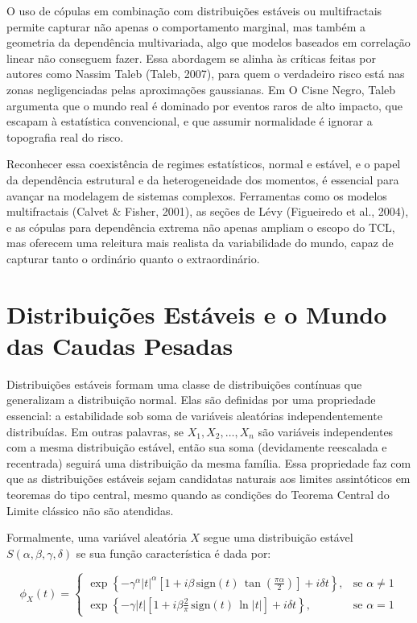 \documentclass[
]{agujournal2019}
\begin{document}
O uso de cópulas em combinação com distribuições estáveis ou
multifractais permite capturar não apenas o comportamento marginal, mas
também a geometria da dependência multivariada, algo que modelos
baseados em correlação linear não conseguem fazer. Essa abordagem se
alinha às críticas feitas por autores como Nassim Taleb (Taleb, 2007),
para quem o verdadeiro risco está nas zonas negligenciadas pelas
aproximações gaussianas. Em O Cisne Negro, Taleb argumenta que o mundo
real é dominado por eventos raros de alto impacto, que escapam à
estatística convencional, e que assumir normalidade é ignorar a
topografia real do risco.

Reconhecer essa coexistência de regimes estatísticos, normal e estável,
e o papel da dependência estrutural e da heterogeneidade dos momentos, é
essencial para avançar na modelagem de sistemas complexos. Ferramentas
como os modelos multifractais (Calvet \& Fisher, 2001), as seções de
Lévy (Figueiredo et al., 2004), e as cópulas para dependência extrema
não apenas ampliam o escopo do TCL, mas oferecem uma releitura mais
realista da variabilidade do mundo, capaz de capturar tanto o ordinário
quanto o extraordinário.

\section{Distribuições Estáveis e o Mundo das Caudas
Pesadas}\label{distribuiuxe7uxf5es-estuxe1veis-e-o-mundo-das-caudas-pesadas}

Distribuições estáveis formam uma classe de distribuições contínuas que
generalizam a distribuição normal. Elas são definidas por uma
propriedade essencial: a estabilidade sob soma de variáveis aleatórias
independentemente distribuídas. Em outras palavras, se
\(X_1, X_2, \dots, X_n\) são variáveis independentes com a mesma
distribuição estável, então sua soma (devidamente reescalada e
recentrada) seguirá uma distribuição da mesma família. Essa propriedade
faz com que as distribuições estáveis sejam candidatas naturais aos
limites assintóticos em teoremas do tipo central, mesmo quando as
condições do Teorema Central do Limite clássico não são atendidas.

Formalmente, uma variável aleatória \(X\) segue uma distribuição estável
\(S(\alpha, \beta, \gamma, \delta)\) se sua função característica é dada
por:

\[
\phi_X(t) = 
\begin{cases}
\exp\left\{ -\gamma^\alpha |t|^\alpha \left[1 + i \beta \, \text{sign}(t) \, \tan\left(\frac{\pi \alpha}{2}\right)\right] + i\delta t \right\}, & \text{se } \alpha \neq 1 \\
\exp\left\{ -\gamma |t| \left[1 + i \beta \frac{2}{\pi} \, \text{sign}(t) \, \ln|t|\right] + i\delta t \right\}, & \text{se } \alpha = 1
\end{cases}
\]
\end{document}
